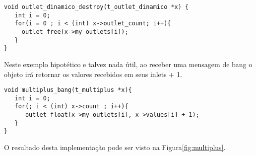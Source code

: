 \begin{lstlisting}[caption=Destrutor com outlets dinâmicos]
void outlet_dinamico_destroy(t_outlet_dinamico *x) {
   int i = 0;
   for(i = 0 ; i < (int) x->outlet_count; i++){
     outlet_free(x->my_outlets[i]);
   }
}
\end{lstlisting}

Neste exemplo hipotético e talvez nada útil, ao receber uma mensagem de bang
o objeto irá retornar os valores recebidos em seus inlets + 1.

\begin{lstlisting}[caption=Destrutor com outlets dinâmicos]
void multiplus_bang(t_multiplus *x){
   int i = 0;
   for(; i < (int) x->count ; i++){
      outlet_float(x->my_outlets[i], x->values[i] + 1);
   }
}
\end{lstlisting}

O resultado desta implementação pode ser visto na Figura\ref{fig:multiplus}.


